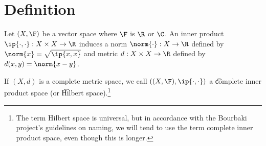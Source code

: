 

\section*{Definition}

Let $(X, \F )$ be a vector space where $\F $ is $\R $ or $\C $.
An inner product $\ip{\cdot ,\cdot }: X \times  X \to \R $ induces a norm $\norm{\cdot }: X \to \R $ defined by $\norm{x} = \sqrt{\ip{x,x}}$ and metric $d: X \times  X \to \R $ defined by $d(x, y) = \norm{x - y}$.

If $(X, d)$ is a complete metric space, we call $((X, \F ), \ip{\cdot ,\cdot })$ a \t{complete inner product space} (or \t{Hilbert space}).\footnote{The term Hilbert space is universal, but in accordance with the Bourbaki project's guidelines on naming, we will tend to use the term complete inner product space, even though this is longer.}

\blankpage